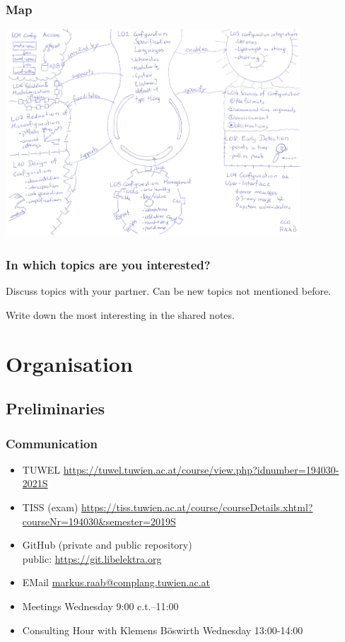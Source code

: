 \begin{frame}
	\frametitle{Map}

	\includegraphics[width=11cm]{pics/map.pdf}
\end{frame}

\begin{assignment}
	\frametitle{In which topics are you interested?}
	\begin{task}[1]
	Discuss topics with your partner.
	Can be new topics not mentioned before.
	\end{task}

	\begin{task}[2]
	Write down the most interesting in the shared notes.
	\end{task}
\end{assignment}





\section{Organisation}

\subsection{Preliminaries}
\begin{frame}
	\frametitle{Communication}
	\begin{itemize}[<+->]
		\item TUWEL \url{https://tuwel.tuwien.ac.at/course/view.php?idnumber=194030-2021S}
		\item TISS (exam) \url{https://tiss.tuwien.ac.at/course/courseDetails.xhtml?courseNr=194030&semester=2019S}
		\item GitHub (private and public repository) \\ public: \url{https://git.libelektra.org}
		\item EMail \url{markus.raab@complang.tuwien.ac.at}
		\item Meetings Wednesday 9:00 c.t.--11:00
		\item Consulting Hour with Klemens Böswirth Wednesday 13:00-14:00
	\end{itemize}
\end{frame}

